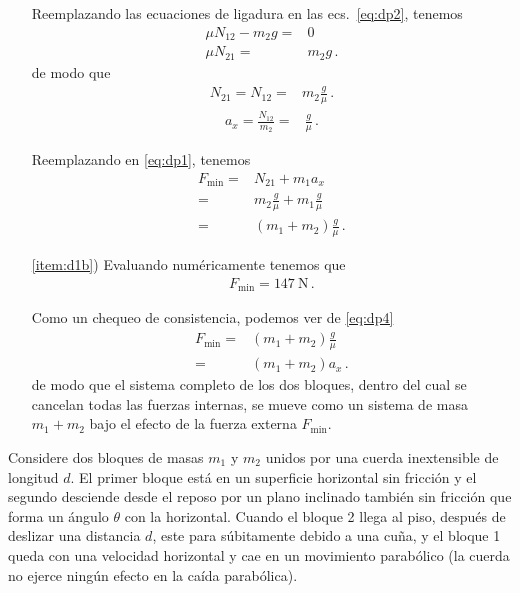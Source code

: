 \begin{frame}
\begin{itemize}
    Reemplazando las ecuaciones de ligadura en las ecs.~\eqref{eq:dp2}, tenemos
    \begin{align*}
      \mu N_{12}-m_2g=&0\nonumber\\
      \mu N_{21}=&m_2g\,.
    \end{align*}
    de modo que 
    \begin{align*}
    N_{21}=N_{12}=&m_2\frac{g}{\mu}\,.
    \end{align*}
    \begin{align*}
    a_x=\frac{N_{12}}{m_2}=&\frac{g}{\mu}\,.
    \end{align*}

    Reemplazando en \eqref{eq:dp1}, tenemos
    \begin{align}
      \label{eq:dp4}
      F_{\text{min}}=&N_{21}+m_1 a_x\nonumber\\
      =&m_2\frac{g}{\mu}+m_1 \frac{g}{\mu}\nonumber\\
      =&(m_1+m_2)\frac{g}{\mu}\,.
    \end{align}

    \item[\ref{item:d1b})] Evaluando numéricamente tenemos que
      \begin{align*}
        F_{\text{min}}=\SI{147}{\newton}\,.
      \end{align*}

      Como un chequeo de consistencia, podemos ver de \eqref{eq:dp4}
      \begin{align*}
        F_{\text{min}}=&(m_1+m_2)\frac{g}{\mu}\nonumber\\
        =&(m_1+m_2)a_x\,.
      \end{align*}
      de modo que el sistema completo de los dos bloques, dentro del
      cual se cancelan todas las fuerzas internas, se mueve como un
      sistema de masa $m_1+m_2$ bajo el efecto de la fuerza externa
      $F_{\text{min}}$.\finejemplo

\end{itemize}
\end{frame}

\ejemplo{}
Considere dos bloques de masas $m_1$ y $m_2$ unidos por 
una cuerda inextensible de longitud $d$. El primer bloque está en un 
superficie horizontal sin fricción y el segundo desciende desde el reposo
por un plano inclinado también sin fricción que forma un ángulo $\theta$ 
con la horizontal. Cuando el bloque 2 llega al piso, después de deslizar
una distancia $d$, este para súbitamente debido a una cuña, y el bloque 1 
queda con una velocidad horizontal y cae en un movimiento parabólico 
(la cuerda no ejerce ningún efecto en la caída parabólica).

